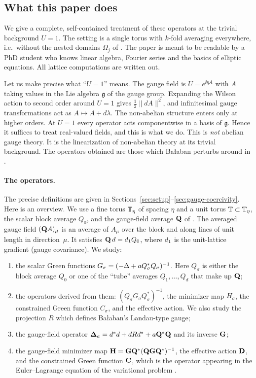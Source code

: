 \subsection{What this paper does}

We give a complete, self-contained treatment of these operators at the trivial background $U=1$. The setting is a single torus with $k$-fold averaging everywhere, i.e.\ without the nested domains $\Omega_j$ of \cite{BalVar}. The paper is meant to be readable by a PhD student who knows linear algebra, Fourier series and the basics of elliptic equations. All lattice computations are written out.

Let us make precise what ``$U=1$'' means. The gauge field is $U=e^{\ii\eta A}$ with $A$ taking values in the Lie algebra $\mathfrak g$ of the gauge group. Expanding the Wilson action to second order around $U=1$ gives $\tfrac12\|dA\|^2$, and infinitesimal gauge transformations act as $A\mapsto A+d\lambda$. The non-abelian structure enters only at higher orders. At $U=1$ every operator acts componentwise in a basis of $\mathfrak g$. Hence it suffices to treat real-valued fields, and this is what we do. This is \emph{not} abelian gauge theory. It is the linearization of non-abelian theory at its trivial background. The operators obtained are those which Ba\l aban perturbs around in \cite{BalBackground,BalVar}.

\paragraph{The operators.} The precise definitions are given in Sections~\ref{sec:setup}--\ref{sec:gauge-coercivity}. Here is an overview. We use a fine torus $\mathbb T_\eta$ of spacing $\eta$ and a unit torus $\mathbb T\subset\mathbb T_\eta$, the scalar block average $Q_0$, and the gauge-field average $\mathbf Q$ of \cite{BalPropI}. The averaged gauge field $(\mathbf Q A)_\mu$ is an average of $A_\mu$ over the block and along lines of unit length in direction~$\mu$. It satisfies $\mathbf Q\,d=d_1 Q_0$, where $d_1$ is the unit-lattice gradient (gauge covariance). We study:
\begin{enumerate}[label=(\roman*)]
\item the scalar Green functions $G_\sigma=(-\Delta+aQ_\sigma^*Q_\sigma)^{-1}$. Here $Q_\sigma$ is either the block average $Q_0$ or one of the ``tube'' averages $Q_1,\dots,Q_d$ that make up $\mathbf Q$;
\item the operators derived from them: $(Q_\sigma G_\sigma Q_\sigma^*)^{-1}$, the minimizer map $H_\sigma$, the constrained Green function $C_\sigma$, and the effective action. We also study the projection $R$ which defines Ba\l aban's Landau-type gauge;
\item the gauge-field operator $\boldsymbol{\Delta}_a=d^*d+dRd^*+a\mathbf Q^*\mathbf Q$ and its inverse $\mathbf G$;
\item the gauge-field minimizer map $\mathbf H=\mathbf G\mathbf Q^*(\mathbf Q\mathbf G\mathbf Q^*)^{-1}$, the effective action $\mathbf D$, and the constrained Green function $\mathbf C$, which is the operator appearing in the Euler--Lagrange equation of the variational problem \cite[(110)--(111)]{BalVar}.
\end{enumerate}

